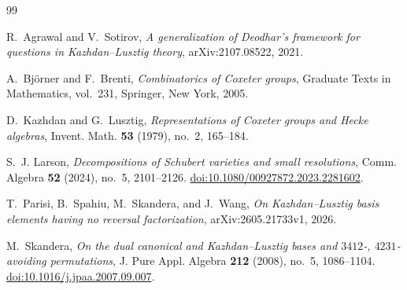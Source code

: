 \documentclass[10pt]{amsart}
\theoremstyle{remark}
\begin{document}
{\small
\begin{thebibliography}{99}

R.~Agrawal and V.~Sotirov,
\emph{A generalization of Deodhar's framework for questions in
Kazhdan--Lusztig theory},
arXiv:2107.08522, 2021.

A.~Bj\"orner and F.~Brenti,
\emph{Combinatorics of Coxeter groups},
Graduate Texts in Mathematics, vol.~231, Springer, New York, 2005.

D.~Kazhdan and G.~Lusztig,
\emph{Representations of Coxeter groups and Hecke algebras},
Invent. Math. \textbf{53} (1979), no.~2, 165--184.

S.~J. Larson,
\emph{Decompositions of Schubert varieties and small resolutions},
Comm. Algebra \textbf{52} (2024), no.~5, 2101--2126.
\href{https://doi.org/10.1080/00927872.2023.2281602}
{doi:10.1080/00927872.2023.2281602}.

T.~Parisi, B.~Spahiu, M.~Skandera, and J.~Wang,
\emph{On Kazhdan--Lusztig basis elements having no reversal
factorization},
arXiv:2605.21733v1, 2026.

M.~Skandera,
\emph{On the dual canonical and Kazhdan--Lusztig bases and
$3412$-, $4231$-avoiding permutations},
J. Pure Appl. Algebra \textbf{212} (2008), no.~5, 1086--1104.
\href{https://doi.org/10.1016/j.jpaa.2007.09.007}
{doi:10.1016/j.jpaa.2007.09.007}.

\end{thebibliography}
}
\end{document}
